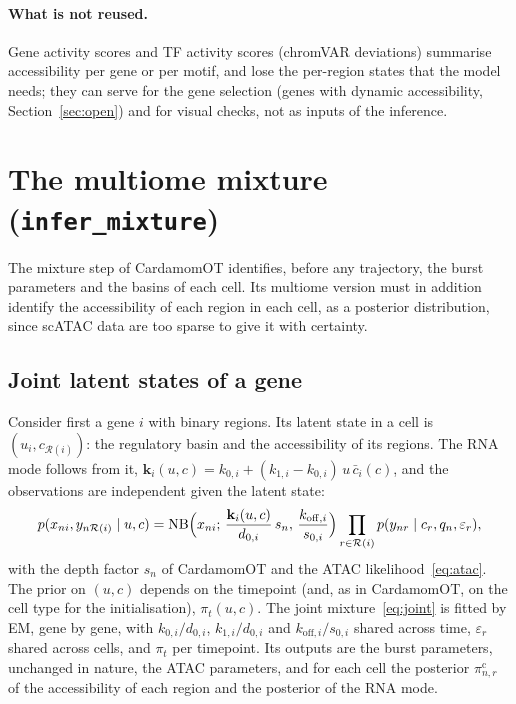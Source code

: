 \documentclass[a4paper, 11pt]{article}
\newcommand{\cbar}{\bar c}
\newcommand{\Rg}{\mathcal{R}}
\theoremstyle{plain}
\theoremstyle{remark}
\begin{document}
\paragraph{What is not reused.} Gene activity scores and TF activity scores (chromVAR deviations) summarise accessibility per gene or per motif, and lose the per-region states that the model needs; they can serve for the gene selection (genes with dynamic accessibility, Section~\ref{sec:open}) and for visual checks, not as inputs of the inference.

\section{The multiome mixture (\texttt{infer\_mixture})}\label{sec:mixture}

The mixture step of CardamomOT identifies, before any trajectory, the burst parameters and the basins of each cell. Its multiome version must in addition identify the accessibility of each region in each cell, as a posterior distribution, since scATAC data are too sparse to give it with certainty.

\subsection{Joint latent states of a gene}

Consider first a gene $i$ with binary regions. Its latent state in a cell is $(u_i, c_{\Rg(i)})$: the regulatory basin and the accessibility of its regions. The RNA mode follows from it, $\mathbf{k}_i(u, c) = k_{0,i} + (k_{1,i} - k_{0,i})\,u\,\cbar_i(c)$, and the observations are independent given the latent state:
\begin{equation}\label{eq:joint}
p(x_{ni}, y_{n\Rg(i)} \mid u, c) = \mathrm{NB}\Bigl(x_{ni};\, \frac{\mathbf{k}_i(u,c)}{d_{0,i}}\,s_n,\, \frac{k_{\mathrm{off},i}}{s_{0,i}}\Bigr) \prod_{r\in\Rg(i)} p(y_{nr} \mid c_r, q_n, \varepsilon_r),
\end{equation}
with the depth factor $s_n$ of CardamomOT and the ATAC likelihood~\eqref{eq:atac}. The prior on $(u, c)$ depends on the timepoint (and, as in CardamomOT, on the cell type for the initialisation), $\pi_t(u, c)$. The joint mixture~\eqref{eq:joint} is fitted by EM, gene by gene, with $k_{0,i}/d_{0,i}$, $k_{1,i}/d_{0,i}$ and $k_{\mathrm{off},i}/s_{0,i}$ shared across time, $\varepsilon_r$ shared across cells, and $\pi_t$ per timepoint. Its outputs are the burst parameters, unchanged in nature, the ATAC parameters, and for each cell the posterior $\pi^{\mathrm{c}}_{n,r}$ of the accessibility of each region and the posterior of the RNA mode.
\end{document}
